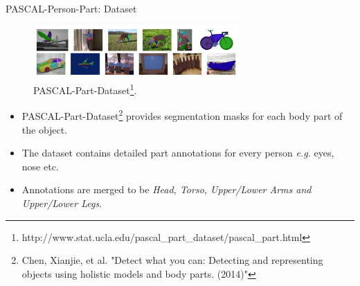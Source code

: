 \documentclass{beamer}
\begin{document}
\begin{frame}{PASCAL-Person-Part: Dataset}
\vspace{-0.4cm}
\begin{figure}
	\centering
	\includegraphics[width=0.7\textwidth]{figure/ss33.png}
	\captionsetup{justification=centering}
	\caption{PASCAL-Part-Dataset\footnote{http://www.stat.ucla.edu/pascal\_part\_dataset/pascal\_part.html}.}
\end{figure}
\vspace{-0.6cm}
\begin{itemize}
	\item {\color{blue}PASCAL-Part-Dataset}\footnote{Chen, Xianjie, et al. "Detect what you can: Detecting and representing\\ objects using holistic models and body parts. (2014)"} provides segmentation masks for each body part of the object.
	\item The dataset contains detailed part annotations for every person \textit{e.g.} eyes, nose etc.
	\item Annotations are merged to be \emph{Head, Torso, Upper/Lower Arms and Upper/Lower Legs}.
\end{itemize}	
\end{frame}
\end{document}
